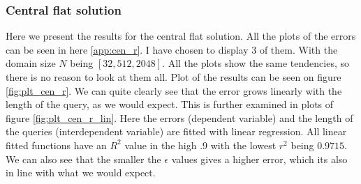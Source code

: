 \documentclass[11pt]{article}
\theoremstyle{definition}
\begin{document}
\subsubsection{Central flat solution}
Here we present the results for the central flat solution. All the plots of the errors can be seen in here \ref{app:cen_r}. I have chosen to display 3 of them. With the domain size $N$ being $[32,512,2048]$. All the plots show the same tendencies, so there is no reason to look at them all. Plot of the results can be seen on figure \ref{fig:plt_cen_r}. We can quite clearly see that the error grows linearly with the length of the query, as we would expect. This is further examined in plots of figure \ref{fig:plt_cen_r_lin}. Here the errors (dependent variable) and the length of the queries (interdependent variable) are fitted with linear regression. All linear fitted functions have an $R^2$ value in the high $.9$ with the lowest $r^2$ being $0.9715$.  We can also see that the smaller the $\epsilon$ values gives a higher error, which its also in line with what we would expect.
\end{document}
